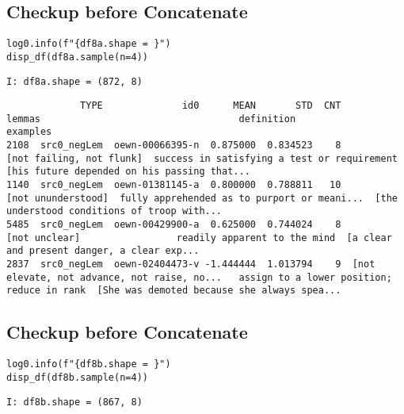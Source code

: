 \documentclass[a4paper,10pt,onecolumn,oneside,openright]{article}
\begin{document}
\subsection{Checkup before Concatenate}
\label{sec:orga8b2e32}
\begin{verbatim}
log0.info(f"{df8a.shape = }")
disp_df(df8a.sample(n=4))
\end{verbatim}

\begin{verbatim}
I: df8a.shape = (872, 8)
\end{verbatim}

\begin{verbatim}
             TYPE              id0      MEAN       STD  CNT                                       lemmas                                   definition                                     examples
2108  src0_negLem  oewn-00066395-n  0.875000  0.834523    8                     [not failing, not flunk]  success in satisfying a test or requirement  [his future depended on his passing that...
1140  src0_negLem  oewn-01381145-a  0.800000  0.788811   10                           [not ununderstood]  fully apprehended as to purport or meani...  [the understood conditions of troop with...
5485  src0_negLem  oewn-00429900-a  0.625000  0.744024    8                                [not unclear]                 readily apparent to the mind  [a clear and present danger, a clear exp...
2837  src0_negLem  oewn-02404473-v -1.444444  1.013794    9  [not elevate, not advance, not raise, no...   assign to a lower position; reduce in rank  [She was demoted because she always spea...
\end{verbatim}

\subsection{Checkup before Concatenate}
\label{sec:org0d27643}
\begin{verbatim}
log0.info(f"{df8b.shape = }")
disp_df(df8b.sample(n=4))
\end{verbatim}

\begin{verbatim}
I: df8b.shape = (867, 8)
\end{verbatim}
\end{document}
